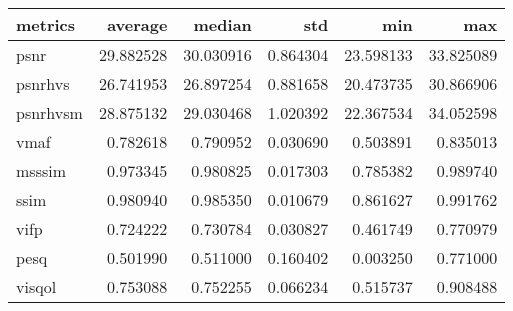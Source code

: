 \begin{tabular}{lrrrrr}
\toprule
metrics & average & median & std & min & max \\
\midrule
psnr & 29.882528 & 30.030916 & 0.864304 & 23.598133 & 33.825089 \\
psnrhvs & 26.741953 & 26.897254 & 0.881658 & 20.473735 & 30.866906 \\
psnrhvsm & 28.875132 & 29.030468 & 1.020392 & 22.367534 & 34.052598 \\
vmaf & 0.782618 & 0.790952 & 0.030690 & 0.503891 & 0.835013 \\
msssim & 0.973345 & 0.980825 & 0.017303 & 0.785382 & 0.989740 \\
ssim & 0.980940 & 0.985350 & 0.010679 & 0.861627 & 0.991762 \\
vifp & 0.724222 & 0.730784 & 0.030827 & 0.461749 & 0.770979 \\
pesq & 0.501990 & 0.511000 & 0.160402 & 0.003250 & 0.771000 \\
visqol & 0.753088 & 0.752255 & 0.066234 & 0.515737 & 0.908488 \\
\bottomrule
\end{tabular}

